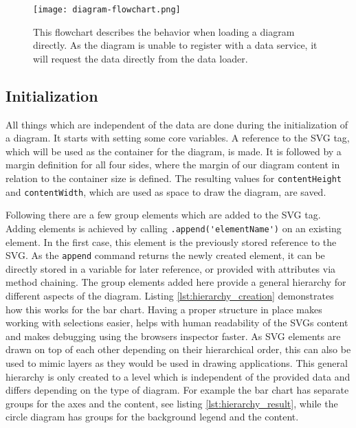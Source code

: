 \begin{figure}[ht]
    \texttt{[image: diagram-flowchart.png]}
    \captionsetup{width=0.9\textwidth}
    \caption[diagram-flowchart]{This flowchart describes the behavior when loading a diagram directly. As the diagram is unable to register with a data service, it will request the data directly from the data loader.}
    \label{fig:diagram-flowchart}
\end{figure}

\subsection{Initialization}\label{sec:initialization}
All things which are independent of the data are done during the initialization of a diagram. It starts with setting some core variables. A reference to the SVG tag, which will be used as the container for the diagram, is made. It is followed by a margin definition for all four sides, where the margin of our diagram content in relation to the container size is defined. The resulting values for \verb|contentHeight| and \verb|contentWidth|, which are used as space to draw the diagram, are saved. 

Following there are a few group elements which are added to the SVG tag. Adding elements is achieved by calling \verb|.append('elementName')| on an existing element. In the first case, this element is the previously stored reference to the SVG. As the \verb|append| command returns the newly created element, it can be directly stored in a variable for later reference, or provided with attributes via method chaining. The group elements added here provide a general hierarchy for different aspects of the diagram. Listing \ref{lst:hierarchy_creation} demonstrates how this works for the bar chart. Having a proper structure in place makes working with selections easier, helps with human readability of the SVGs content and makes debugging using the browsers inspector faster. As SVG elements are drawn on top of each other depending on their hierarchical order, this can also be used to mimic layers as they would be used in drawing applications. This general hierarchy is only created to a level which is independent of the provided data and differs depending on the type of diagram. For example the bar chart has separate groups for the axes and the content, see listing \ref{lst:hierarchy_result}, while the circle diagram has groups for the background legend and the content.

